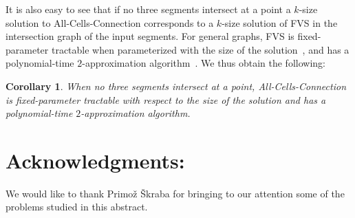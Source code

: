 \documentclass[11pt,a4paper]{article}
\newtheorem{corollary}[definition]{Corollary}
\begin{document}
It is also easy to see that if no three segments intersect at a point a $k$-size solution to {\sc All-Cells-Connection}
corresponds to a $k$-size solution of FVS in the intersection graph of the input segments. 
For general graphs, FVS is fixed-parameter tractable when parameterized with the size of the solution~\cite{CFLLV08}, and has a polynomial-time $2$-approximation algorithm~\cite{V01}. We thus obtain the following:

\begin{corollary}
When no three segments intersect at a point, {\sc All-Cells-Connection} is fixed-parameter tractable with respect to the size of the solution and has a polynomial-time $2$-approximation algorithm.
\end{corollary}



\section*{Acknowledgments:}
We would like to thank Primo{\v z} {\v S}kraba
 for bringing to our attention some of the problems studied in this abstract.



\end{document}
